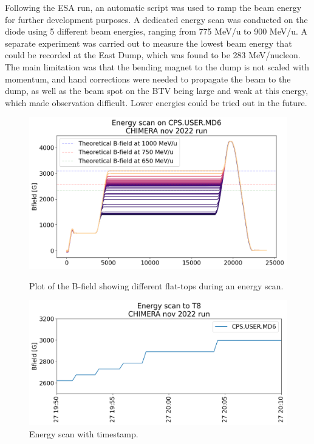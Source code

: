 Following the ESA run, an automatic script was used to ramp the beam energy for further development purposes. A dedicated energy scan was conducted on the diode using 5 different beam energies, ranging from 775 MeV/u to 900 MeV/u. A separate experiment was carried out to measure the lowest beam energy that could be recorded at the East Dump, which was found to be 283 MeV/nucleon. The main limitation was that the bending magnet to the dump is not scaled with momentum, and hand corrections were needed to propagate the beam to the dump, as well as the beam spot on the BTV being large and weak at this energy, which made observation difficult. Lower energies could be tried out in the future.


\begin{figure}
    \centering
    \begin{minipage}{0.45\textwidth}
        \centering
        \includegraphics[width=1.0\textwidth]{images/PS_BEAM_ENERGY/energy_scan_chimera 1.png}
        \caption{Plot of the B-field showing different flat-tops during an energy scan.}
        \label{fig:energy_scan}
    \end{minipage}\hfill
    \begin{minipage}{0.45\textwidth}
        \centering
        \includegraphics[width=1.0\textwidth]{images/PS_BEAM_ENERGY/energy_scan_timestamp_chimera 1.png} 
        \caption{Energy scan with timestamp.}
        \label{fig:energy_scan_timestamp}
    \end{minipage}
\end{figure}